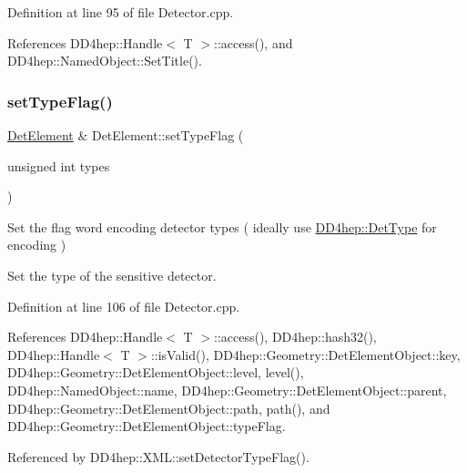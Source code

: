 Definition at line 95 of file Detector.\+cpp.



References D\+D4hep\+::\+Handle$<$ T $>$\+::access(), and D\+D4hep\+::\+Named\+Object\+::\+Set\+Title().

\hypertarget{class_d_d4hep_1_1_geometry_1_1_det_element_a5a03e88dd7e1e3f215116f44dfca1dce}{}\label{class_d_d4hep_1_1_geometry_1_1_det_element_a5a03e88dd7e1e3f215116f44dfca1dce} 
\subsubsection{\texorpdfstring{set\+Type\+Flag()}{setTypeFlag()}}
{\footnotesize\ttfamily \hyperlink{class_d_d4hep_1_1_geometry_1_1_det_element}{Det\+Element} \& Det\+Element\+::set\+Type\+Flag (\begin{DoxyParamCaption}\item[{unsigned int}]{types }\end{DoxyParamCaption})}



Set the flag word encoding detector types ( ideally use \hyperlink{class_d_d4hep_1_1_det_type}{D\+D4hep\+::\+Det\+Type} for encoding ) 

Set the type of the sensitive detector. 

Definition at line 106 of file Detector.\+cpp.



References D\+D4hep\+::\+Handle$<$ T $>$\+::access(), D\+D4hep\+::hash32(), D\+D4hep\+::\+Handle$<$ T $>$\+::is\+Valid(), D\+D4hep\+::\+Geometry\+::\+Det\+Element\+Object\+::key, D\+D4hep\+::\+Geometry\+::\+Det\+Element\+Object\+::level, level(), D\+D4hep\+::\+Named\+Object\+::name, D\+D4hep\+::\+Geometry\+::\+Det\+Element\+Object\+::parent, D\+D4hep\+::\+Geometry\+::\+Det\+Element\+Object\+::path, path(), and D\+D4hep\+::\+Geometry\+::\+Det\+Element\+Object\+::type\+Flag.



Referenced by D\+D4hep\+::\+X\+M\+L\+::set\+Detector\+Type\+Flag().

\hypertarget{class_d_d4hep_1_1_geometry_1_1_det_element_a7dc1ba8329573379fa2f087cee977c98}{}\label{class_d_d4hep_1_1_geometry_1_1_det_element_a7dc1ba8329573379fa2f087cee977c98} 
